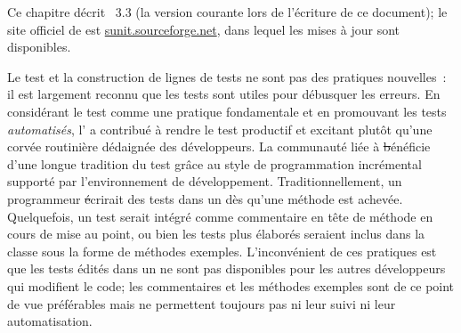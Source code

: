 \documentclass[a4paper,10pt,twoside]{book}
\begin{document}
\arevoir{} %


Ce chapitre décrit \SUnit~3.3 (la version courante lors de l'écriture de ce document); le site officiel de \sunit est \url{sunit.sourceforge.net}, dans lequel les mises à jour sont disponibles.

Le test et la construction de lignes de tests ne sont pas des pratiques nouvelles~: il est largement reconnu que les tests sont utiles pour débusquer les erreurs. En considérant le test comme une pratique fondamentale et en promouvant les tests \emph{automatisés}, l'\mbox{} a contribué à rendre le test productif et excitant plutôt qu'une corvée routinière dédaignée des développeurs. La communauté liée à \st bénéficie d'une longue tradition du test grâce au style de programmation incrémental supporté par l'environnement de développement.
Traditionnellement, un programmeur \st écrirait des tests dans un  dès qu'une méthode est achevée. Quelquefois, un test serait intégré comme commentaire en tête de méthode en cours de mise au point, ou bien les tests plus élaborés seraient inclus dans la classe sous la forme de méthodes exemples. L'inconvénient de ces pratiques est que les tests édités dans un  ne sont pas disponibles pour les autres développeurs qui modifient le code; les commentaires et les méthodes exemples sont de ce point de vue préférables mais ne permettent toujours pas ni leur suivi ni leur automatisation. 
\end{document}
